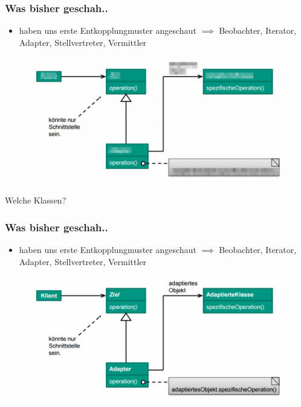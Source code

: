 \documentclass[18pt]{beamer}
\begin{document}
	\begin{frame}
		\frametitle{Was bisher geschah..}
		\begin{itemize}
			\item haben uns erste Entkopplungmuster angeschaut
			\linebreak $\implies$ Beobachter, Iterator, Adapter, Stellvertreter, Vermittler
		\end{itemize}
		\begin{figure}
			\includegraphics[scale=0.33]{./pics/tut4/adap-obj-mod.png}
		\end{figure}
		Welche Klassen?
	\end{frame}
	
	\begin{frame}
		\frametitle{Was bisher geschah..}
		\begin{itemize}
			\item haben uns erste Entkopplungmuster angeschaut
			\linebreak $\implies$ Beobachter, Iterator, Adapter, Stellvertreter, Vermittler
		\end{itemize}
		\begin{figure}
			\includegraphics[scale=0.45]{./pics/tut3/adap-obj.png}
		\end{figure}
	\end{frame}
	
\end{document}

